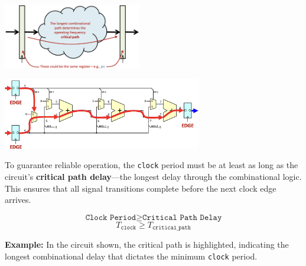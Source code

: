 \begin{minipage}[htp]{0.45\textwidth}
    \begin{center}
        \includegraphics[width=0.45\textwidth]{chapters/chapter4b/images/prop_time.png}
    \end{center}
\end{minipage}
\hfill
\vline
\hfill
\begin{minipage}[htp]{0.45\textwidth}
    \begin{center}
        \includegraphics[width=0.65\textwidth]{chapters/chapter4b/images/prop_diag.png}
    \end{center}
\end{minipage}
To guarantee reliable operation, the \texttt{clock} period must be at least as long as the circuit's \textbf{critical path delay}—the longest delay through the combinational logic. This ensures that all signal transitions complete before the next clock edge arrives.

\[
\texttt{Clock Period} \geq \texttt{Critical Path Delay}
\]
\[
T_{\texttt{clock}} \geq T_{\texttt{critical\_path}}
\]


\noindent \textbf{Example:} In the circuit shown, the critical path is highlighted, indicating the longest combinational delay that dictates the minimum \texttt{clock} period.

\newpage

